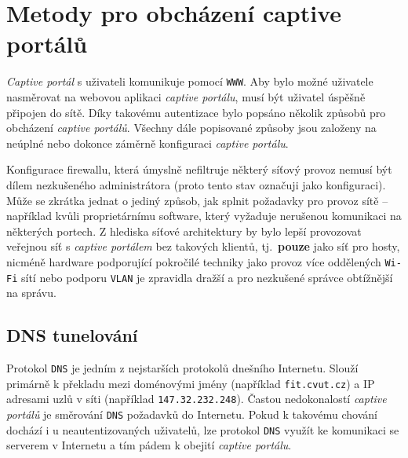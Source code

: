 \documentclass[thesis=M,czech]{FITthesis}[2012/10/20]
\begin{document}

\section{Metody pro obcházení captive portálů}
\label{sec:metody-obchazeni-captive-portalu}

\textit{Captive portál} s uživateli komunikuje pomocí \texttt{WWW}. Aby bylo možné uživatele nasměrovat na webovou aplikaci \textit{captive portálu}, musí být uživatel úspěšně připojen do sítě. Díky takovému  autentizace bylo popsáno několik způsobů pro obcházení \textit{captive portálů}. Všechny dále popisované způsoby jsou založeny na neúplné nebo dokonce záměrně  konfiguraci \textit{captive portálu}.

Konfigurace firewallu, která úmyslně nefiltruje některý síťový provoz nemusí být dílem nezkušeného administrátora (proto tento stav označuji jako \textbf{} konfiguraci). Může se zkrátka jednat o jediný způsob, jak splnit požadavky pro provoz sítě -- například kvůli proprietárnímu software, který vyžaduje nerušenou komunikaci na některých portech. Z hlediska síťové architektury by bylo lepší provozovat veřejnou síť s \textit{captive portálem} bez takových klientů, tj.~\textbf{pouze} jako síť pro hosty, nicméně hardware podporující pokročilé techniky jako provoz více oddělených \texttt{Wi-Fi} sítí nebo podporu \texttt{VLAN} je zpravidla dražší a pro nezkušené správce obtížnější na správu.


\subsection{DNS tunelování}
\label{subsec:dns-tunel-intro}

Protokol \texttt{DNS} je jedním z nejstarších protokolů dnešního Internetu. Slouží primárně k překladu mezi doménovými jmény (například \texttt{fit.cvut.cz}) a IP adresami uzlů v síti (například \texttt{147.32.232.248}). Častou nedokonalostí \textit{captive portálů} je směrování \texttt{DNS} požadavků do Internetu. Pokud k takovému chování dochází i u neautentizovaných uživatelů, lze protokol \texttt{DNS} využít ke komunikaci se serverem v Internetu a tím pádem k obejití \textit{captive portálu}.

\end{document}
